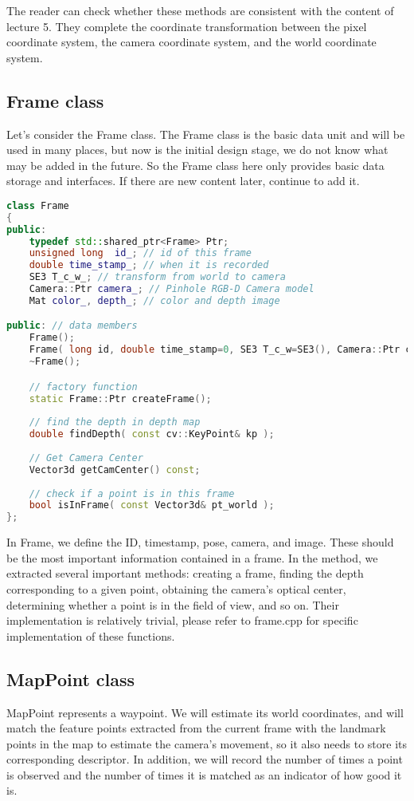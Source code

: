 The reader can check whether these methods are consistent with the content of lecture 5. They complete the coordinate transformation between the pixel coordinate system, the camera coordinate system, and the world coordinate system.

\subsection{Frame class}
Let's consider the Frame class. The Frame class is the basic data unit and will be used in many places, but now is the initial design stage, we do not know what may be added in the future. So the Frame class here only provides basic data storage and interfaces. If there are new content later, continue to add it.

\begin{lstlisting}[language=c++,caption=slambook/project/0.1/include/myslam/frame.h]
class Frame
{
public:
	typedef std::shared_ptr<Frame> Ptr;
	unsigned long  id_; // id of this frame
	double time_stamp_; // when it is recorded
	SE3 T_c_w_; // transform from world to camera
	Camera::Ptr camera_; // Pinhole RGB-D Camera model 
	Mat color_, depth_; // color and depth image 

public: // data members 
	Frame();
	Frame( long id, double time_stamp=0, SE3 T_c_w=SE3(), Camera::Ptr camera=nullptr, Mat color=Mat(), Mat depth=Mat() );
	~Frame();

	// factory function
	static Frame::Ptr createFrame(); 
	
	// find the depth in depth map
	double findDepth( const cv::KeyPoint& kp );
	
	// Get Camera Center
	Vector3d getCamCenter() const;
	
	// check if a point is in this frame 
	bool isInFrame( const Vector3d& pt_world );
};
\end{lstlisting}

In Frame, we define the ID, timestamp, pose, camera, and image. These should be the most important information contained in a frame. In the method, we extracted several important methods: creating a frame, finding the depth corresponding to a given point, obtaining the camera's optical center, determining whether a point is in the field of view, and so on. Their implementation is relatively trivial, please refer to frame.cpp for specific implementation of these functions.

\subsection{MapPoint class}
MapPoint represents a waypoint. We will estimate its world coordinates, and will match the feature points extracted from the current frame with the landmark points in the map to estimate the camera's movement, so it also needs to store its corresponding descriptor. In addition, we will record the number of times a point is observed and the number of times it is matched as an indicator of how good it is.

